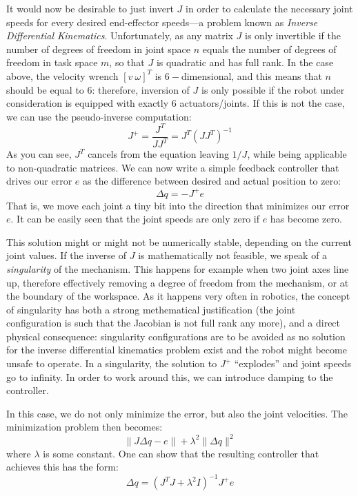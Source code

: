 It would now be desirable to just invert $J$ in order to calculate the necessary joint speeds for every desired end-effector speeds---a problem known as \emph{Inverse Differential Kinematics}. Unfortunately, as any matrix $J$ is only invertible if the number of degrees of freedom in joint space $n$ equals the number of degrees of freedom in task space $m$, so that $ J$ is quadratic and has full rank.
In the case above, the velocity wrench $[v \ \omega]^T$ is $6-$dimensional, and this means that $n$ should be equal to $6$: therefore, inversion of $J$ is only possible if the robot under consideration is equipped with exactly $6$ actuators/joints.
If this is not the case, we can use the pseudo-inverse computation:
\begin{equation}
J^+=\frac{J^T}{JJ^T}=J^T(JJ^T)^{-1}
\end{equation}
As you can see, $J^T$ cancels from the equation leaving $1/J$, while being applicable to non-quadratic matrices.
We can now write a simple feedback controller that drives our error $e$ as the difference between desired and actual position to zero:
\begin{equation}
\Delta{q}=-J^+e
\end{equation}
That is, we move each joint a tiny bit into the direction that minimizes our error $e$.
It can be easily seen that the joint speeds are only zero if $e$ has become zero.

This solution might or might not be numerically stable, depending on the current joint values. If the inverse of $J$ is mathematically not feasible, we speak of a \emph{singularity} of the mechanism. This happens for example when two joint axes line up, therefore effectively removing a degree of freedom from the mechanism, or at the boundary of the workspace. As it happens very often in robotics, the concept of singularity has both a strong methematical justification (the joint configuration is such that the Jacobian is not full rank any more), and a direct physical consequence: singularity configurations are to be avoided as no solution for the inverse differential kinematics problem exist and the robot might become unsafe to operate.
In a singularity, the solution to $ J^+$ ``explodes'' and joint speeds go to infinity. In order to work around this, we can introduce damping to the controller.

In this case, we do not only minimize the error, but also the joint velocities. The minimization problem then becomes:
\begin{equation}
\|J\Delta q-e\|+\lambda^2\|\Delta q\|^2
\end{equation}
where $\lambda$ is some constant. One can show that the resulting controller that achieves this has the form:
\begin{equation}
\Delta q=(J^TJ+\lambda^2 I)^{-1}J^+e
\end{equation}

